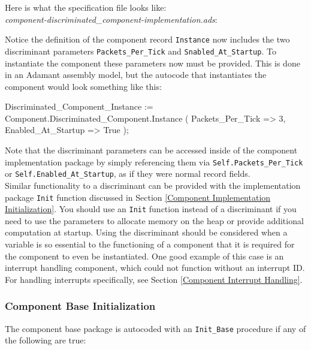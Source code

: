 Here is what the specification file looks like: \\

\textit{component-discriminated\_component-implementation.ads}:

Notice the definition of the component record \texttt{Instance} now includes the two discriminant parameters \texttt{Packets\_Per\_Tick} and \texttt{Snabled\_At\_Startup}. To instantiate the component these parameters now must be provided. This is done in an Adamant assembly model, but the autocode that instantiates the component would look something like this:

\vspace{5mm} %
\begin{adacode}
  Discriminated_Component_Instance := Component.Discriminated_Component.Instance (
    Packets_Per_Tick => 3,
    Enabled_At_Startup => True
  );
\end{adacode}
\vspace{5mm} %

Note that the discriminant parameters can be accessed inside of the component implementation package by simply referencing them via \texttt{Self.Packets\_Per\_Tick} or \texttt{Self.Enabled\_At\_Startup}, as if they were normal record fields. \\

Similar functionality to a discriminant can be provided with the implementation package \texttt{Init} function discussed in Section \ref{Component Implementation Initialization}. You should use an \texttt{Init} function instead of a discriminant if you need to use the parameters to allocate memory on the heap or provide additional computation at startup. Using the discriminant should be considered when a variable is so essential to the functioning of a component that it is required for the component to even be instantiated. One good example of this case is an interrupt handling component, which could not function without an interrupt ID. For handling interrupts specifically, see Section \ref{Component Interrupt Handling}.

\subsubsection{Component Base Initialization} \label{Component Base Initialization}

The component base package is autocoded with an \texttt{Init\_Base} procedure if any of the following are true:

